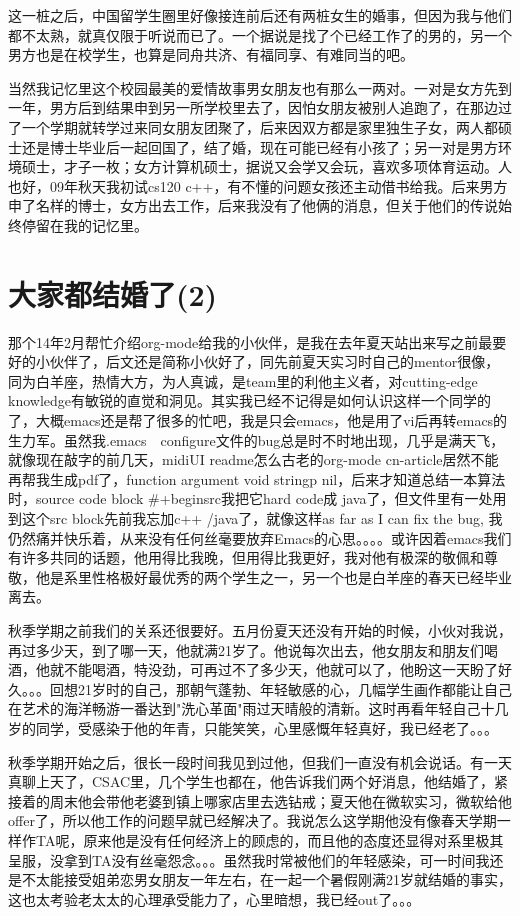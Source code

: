 \documentclass[12pt]{book}
\begin{document}
这一桩之后，中国留学生圈里好像接连前后还有两桩女生的婚事，但因为我与他们都不太熟，就真仅限于听说而已了。一个据说是找了个已经工作了的男的，另一个男方也是在校学生，也算是同舟共济、有福同享、有难同当的吧。

当然我记忆里这个校园最美的爱情故事男女朋友也有那么一两对。一对是女方先到一年，男方后到结果申到另一所学校里去了，因怕女朋友被别人追跑了，在那边过了一个学期就转学过来同女朋友团聚了，后来因双方都是家里独生子女，两人都硕士还是博士毕业后一起回国了，结了婚，现在可能已经有小孩了；另一对是男方环境硕士，才子一枚；女方计算机硕士，据说又会学又会玩，喜欢多项体育运动。人也好，09年秋天我初试cs120 c++，有不懂的问题女孩还主动借书给我。后来男方申了名样的博士，女方出去工作，后来我没有了他俩的消息，但关于他们的传说始终停留在我的记忆里。

\section{大家都结婚了(2)}
\label{sec-11-2}
那个14年2月帮忙介绍org-mode给我的小伙伴，是我在去年夏天站出来写之前最要好的小伙伴了，后文还是简称小伙好了，同先前夏天实习时自己的mentor很像，同为白羊座，热情大方，为人真诚，是team里的利他主义者，对cutting-edge knowledge有敏锐的直觉和洞见。其实我已经不记得是如何认识这样一个同学的了，大概emacs还是帮了很多的忙吧，我是只会emacs，他是用了vi后再转emacs的生力军。虽然我.emacs　configure文件的bug总是时不时地出现，几乎是满天飞，就像现在敲字的前几天，midiUI readme怎么古老的org-mode cn-article居然不能再帮我生成pdf了，function argument void stringp nil，后来才知道总结一本算法时，source code block \#+begin\textunderscore src我把它hard code成 java了，但文件里有一处用到这个src block先前我忘加c++ /java了，就像这样as far as I can fix the bug, 我仍然痛并快乐着，从来没有任何丝毫要放弃Emacs的心思。。。。或许因着emacs我们有许多共同的话题，他用得比我晚，但用得比我更好，我对他有极深的敬佩和尊敬，他是系里性格极好最优秀的两个学生之一，另一个也是白羊座的春天已经毕业离去。

秋季学期之前我们的关系还很要好。五月份夏天还没有开始的时候，小伙对我说，再过多少天，到了哪一天，他就满21岁了。他说每次出去，他女朋友和朋友们喝酒，他就不能喝酒，特没劲，可再过不了多少天，他就可以了，他盼这一天盼了好久。。。回想21岁时的自己，那朝气蓬勃、年轻敏感的心，几幅学生画作都能让自己在艺术的海洋畅游一番达到"洗心革面"雨过天晴般的清新。这时再看年轻自己十几岁的同学，受感染于他的年青，只能笑笑，心里感慨年轻真好，我已经老了。。。

秋季学期开始之后，很长一段时间我见到过他，但我们一直没有机会说话。有一天真聊上天了，CSAC里，几个学生也都在，他告诉我们两个好消息，他结婚了，紧接着的周末他会带他老婆到镇上哪家店里去选钻戒；夏天他在微软实习，微软给他offer了，所以他工作的问题早就已经解决了。我说怎么这学期他没有像春天学期一样作TA呢，原来他是没有任何经济上的顾虑的，而且他的态度还显得对系里极其呈服，没拿到TA没有丝毫怨念。。。虽然我时常被他们的年轻感染，可一时间我还是不太能接受姐弟恋男女朋友一年左右，在一起一个暑假刚满21岁就结婚的事实，这也太考验老太太的心理承受能力了，心里暗想，我已经out了。。。
\end{document}

